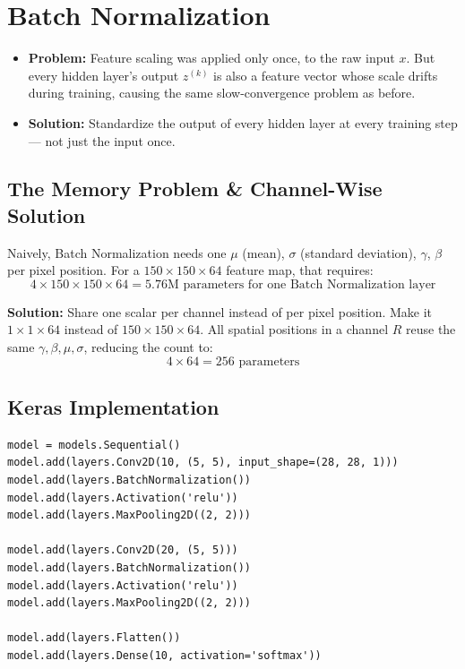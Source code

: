 \section{Batch Normalization}

\begin{itemize}
    \item \textbf{Problem:} Feature scaling was applied only once, to the raw input $x$. But every hidden layer's output $z^{(k)}$ is also a feature vector whose scale drifts during training, causing the same slow-convergence problem as before.
    \item \textbf{Solution:} Standardize the output of every hidden layer at every training step — not just the input once.
\end{itemize}

\subsection{The Memory Problem \& Channel-Wise Solution}

Naively, Batch Normalization needs one $\mu$ (mean), $\sigma$ (standard deviation), $\gamma$, $\beta$ per pixel position. For a $150 \times 150 \times 64$ feature map, that requires:
\begin{equation}
4 \times 150 \times 150 \times 64 = 5.76\text{M parameters for one Batch Normalization layer}
\end{equation}

\textbf{Solution:} Share one scalar per channel instead of per pixel position. Make it $1 \times 1 \times 64$ instead of $150 \times 150 \times 64$. All spatial positions in a channel $R$ reuse the same $\gamma, \beta, \mu, \sigma$, reducing the count to:
\begin{equation}
4 \times 64 = \boxed{256 \text{ parameters}}
\end{equation}
\subsection{Keras Implementation}

\begin{verbatim}
model = models.Sequential()
model.add(layers.Conv2D(10, (5, 5), input_shape=(28, 28, 1)))
model.add(layers.BatchNormalization())
model.add(layers.Activation('relu'))
model.add(layers.MaxPooling2D((2, 2)))

model.add(layers.Conv2D(20, (5, 5)))
model.add(layers.BatchNormalization())
model.add(layers.Activation('relu'))
model.add(layers.MaxPooling2D((2, 2)))

model.add(layers.Flatten())
model.add(layers.Dense(10, activation='softmax'))
\end{verbatim}

